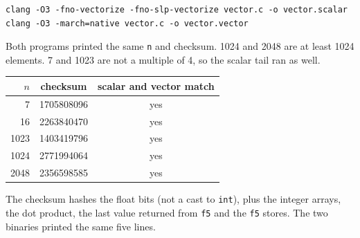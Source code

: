 \documentclass[11pt,a4paper]{article}
\begin{document}
\begin{lstlisting}[language={},basicstyle=\ttfamily\footnotesize]
clang -O3 -fno-vectorize -fno-slp-vectorize vector.c -o vector.scalar
clang -O3 -march=native vector.c -o vector.vector
\end{lstlisting}

Both programs printed the same \texttt{n} and checksum. 1024 and 2048
are at least 1024 elements. 7 and 1023 are not a multiple of 4, so the
scalar tail ran as well.

{\small
\begin{tabular}{rcc}
\hline
$n$ & checksum & scalar and vector match \\
\hline
7 & 1705808096 & yes \\
16 & 2263840470 & yes \\
1023 & 1403419796 & yes \\
1024 & 2771994064 & yes \\
2048 & 2356598585 & yes \\
\hline
\end{tabular}
}

The checksum hashes the float bits (not a cast to \texttt{int}),
plus the integer arrays, the dot product, the last value returned
from \texttt{f5} and the \texttt{f5} stores. The two binaries
printed the same five lines.
\end{document}

